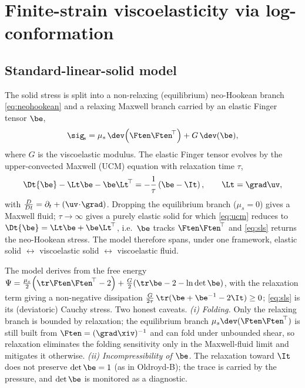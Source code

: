 \section{Finite-strain viscoelasticity via log-conformation}
\label{sec:constitutive}

\subsection{Standard-linear-solid model}
The solid stress is split into a non-relaxing (equilibrium) neo-Hookean branch
\cref{eq:neohookean} and a relaxing Maxwell branch carried by an elastic Finger tensor
$\be$,
\begin{equation}
\sig_{\!s} = \mu_s\,\dev\!\left(\Ften\Ften^{\!\top}\right)
   + G\,\dev(\be),
\label{eq:sls}
\end{equation}
where $G$ is the viscoelastic modulus. The elastic Finger tensor evolves by the
upper-convected Maxwell (UCM) equation with relaxation time $\tau$,
\begin{equation}
\Dt{\be} - \Lt\be - \be\Lt^{\!\top} = -\frac1\tau\left(\be-\It\right),
\qquad \Lt=\grad\uv,
\label{eq:ucm}
\end{equation}
with $\tfrac{D}{Dt}=\partial_t+(\uv\!\cdot\!\grad)$. Dropping the equilibrium branch
($\mu_s=0$) gives a Maxwell fluid; $\tau\to\infty$ gives a purely elastic solid for
which \cref{eq:ucm} reduces to $\Dt{\be}=\Lt\be+\be\Lt^{\!\top}$, i.e.\ $\be$ tracks
$\Ften\Ften^{\!\top}$ and \cref{eq:sls} returns the neo-Hookean stress. The model
therefore spans, under one framework, elastic solid $\leftrightarrow$ viscoelastic
solid $\leftrightarrow$ viscoelastic fluid.

The model derives from the free energy
$\Psi=\tfrac{\mu_s}{2}\!\left(\tr\Ften\Ften^{\!\top}-2\right)
      +\tfrac{G}{2}\!\left(\tr\be-2-\ln\det\be\right)$,
with the relaxation term giving a non-negative dissipation $\tfrac{G}{2\tau}\,
\tr(\be+\be^{-1}-2\It)\ge0$; \cref{eq:sls} is its (deviatoric) Cauchy stress.
Two honest caveats. \emph{(i) Folding.} Only the relaxing branch is bounded by
relaxation; the equilibrium branch $\mu_s\dev(\Ften\Ften^{\!\top})$ is still built from
$\Ften=(\grad\xiv)^{-1}$ and can fold under unbounded shear, so relaxation eliminates the
folding sensitivity only in the Maxwell-fluid limit and mitigates it otherwise.
\emph{(ii) Incompressibility of $\be$.} The relaxation toward $\It$ does not preserve
$\det\be=1$ (as in Oldroyd-B); the trace is carried by the pressure, and $\det\be$ is
monitored as a diagnostic.

